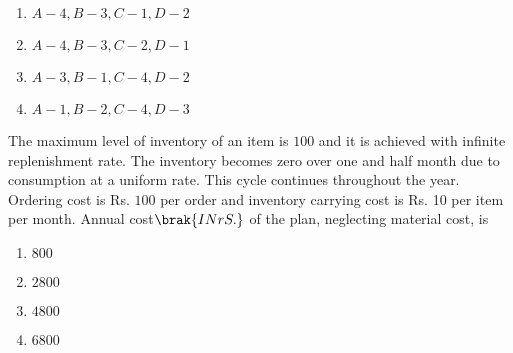       \begin{multicols}{2}
        \begin{enumerate}
            \item $A-4,B-3,C-1,D-2$
            \item $A-4,B-3,C-2,D-1$
            \item $A-3,B-1,C-4,D-2$
            \item $A-1,B-2,C-4,D-3$
        \end{enumerate}
    \end{multicols}

    \item The maximum level of inventory of an item is $100$ and it is achieved with infinite replenishment rate. The inventory becomes zero over one and half month due to consumption at a uniform rate. This cycle continues throughout the year. Ordering cost is Rs. $100$ per order and inventory carrying cost is Rs. 10 per item per month. Annual cost$ \brak{IN rS.}$ of the plan, neglecting material cost, is
    \begin{multicols}{4}
        \begin{enumerate}
            \item $800$
            \item $2800$
            \item $4800$
            \item $6800$
        \end{enumerate}
    \end{multicols}
    

